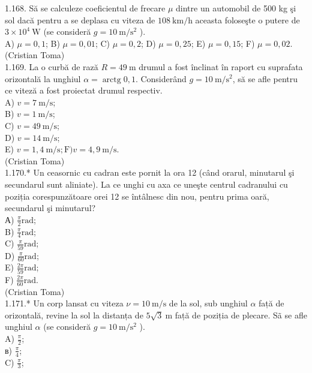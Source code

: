 \documentclass[10pt]{article}
\begin{document}
1.168. Să se calculeze coeficientul de frecare $\mu$ dintre un automobil de 500 kg şi sol dacă pentru a se deplasa cu viteza de $108 \mathrm{~km} / \mathrm{h}$ aceasta foloseşte o putere de $3 \times 10^{4} \mathrm{~W}$ (se consideră $g=10 \mathrm{~m} / \mathrm{s}^{2}$ ).\\
A) $\mu=0,1$; B) $\mu=0,01$; C) $\mu=0,2$; D) $\mu=0,25$; E) $\mu=0,15$; F) $\mu=0,02$.\\
(Cristian Toma)\\
1.169. La o curbă de rază $R=49 \mathrm{~m}$ drumul a fost înclinat în raport cu suprafata orizontală la unghiul $\alpha=\operatorname{arctg} 0,1$. Considerând $g=10 \mathrm{~m} / \mathrm{s}^{2}$, să se afle pentru ce viteză a fost proiectat drumul respectiv.\\
A) $v=7 \mathrm{~m} / \mathrm{s}$;\\
B) $v=1 \mathrm{~m} / \mathrm{s}$;\\
C) $v=49 \mathrm{~m} / \mathrm{s}$;\\
D) $v=14 \mathrm{~m} / \mathrm{s}$;\\
E) $v=1,4 \mathrm{~m} / \mathrm{s} ; \mathrm{F}) v=4,9 \mathrm{~m} / \mathrm{s}$.\\
(Cristian Toma)\\
1.170.* Un ceasornic cu cadran este pornit la ora 12 (când orarul, minutarul şi secundarul sunt aliniate). La ce unghi cu axa ce uneşte centrul cadranului cu poziția corespunzătoare orei 12 se întâlnesc din nou, pentru prima oară, secundarul şi minutarul?\\
А) $\frac{\pi}{2} \mathrm{rad}$;\\
B) $\frac{\pi}{4} \mathrm{rad}$;\\
C) $\frac{\pi}{59} \mathrm{rad}$;\\
D) $\frac{\pi}{60} \mathrm{rad}$;\\
E) $\frac{2 \pi}{59} \mathrm{rad}$;\\
F) $\frac{2 \pi}{60} \mathrm{rad}$.\\
(Cristian Toma)\\
1.171.* Un corp lansat cu viteza $\nu=10 \mathrm{~m} / \mathrm{s}$ de la sol, sub unghiul $\alpha$ față de orizontală, revine la sol la distanța de $5 \sqrt{3} \mathrm{~m}$ față de poziția de plecare. Sã se afle unghiul $\alpha$ (se consideră $g=10 \mathrm{~m} / \mathrm{s}^{2}$ ).\\
A) $\frac{\pi}{2}$;\\
в) $\frac{\pi}{4}$;\\
C) $\frac{\pi}{3}$;\\
\end{document}
